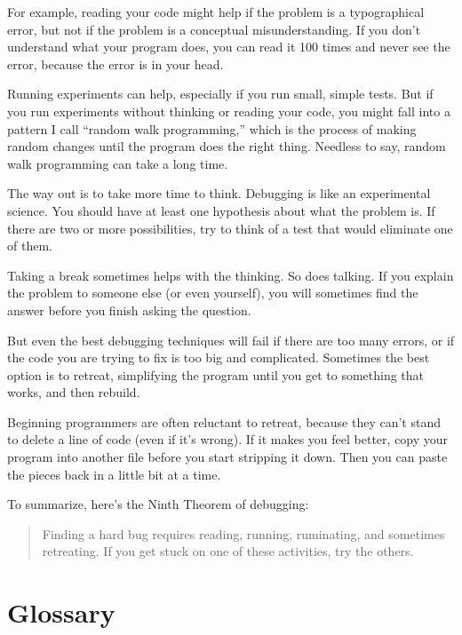 \documentclass{book}
\begin{document}
For example, reading your code might help if the problem is a
typographical error, but not if the problem is a conceptual
misunderstanding. If you don't understand what your program does, you
can read it 100 times and never see the error, because the error is in
your head.

Running experiments can help, especially if you run small, simple
tests. But if you run experiments without thinking or reading your
code, you might fall into a pattern I call ``random walk programming,''
which is the process of making random changes until the program
does the right thing. Needless to say, random walk programming
can take a long time.

The way out is to take more time to think. Debugging is like an
experimental science. You should have at least one hypothesis about
what the problem is. If there are two or more possibilities, try to
think of a test that would eliminate one of them.

Taking a break sometimes helps with the thinking. So does talking.
If you explain the problem to someone else (or even yourself), you
will sometimes find the answer before you finish asking the question.

But even the best debugging techniques will fail if there are too many
errors, or if the code you are trying to fix is too big and
complicated. Sometimes the best option is to retreat, simplifying the
program until you get to something that works, and then rebuild.

Beginning programmers are often reluctant to retreat, because
they can't stand to delete a line of code (even if it's wrong).
If it makes you feel better, copy your program into another file
before you start stripping it down. Then you can paste the pieces
back in a little bit at a time.

To summarize, here's the Ninth Theorem of debugging:

\begin{quote}
Finding a hard bug requires reading, running, ruminating, and
sometimes retreating. If you get stuck on one of these activities,
try the others.
\end{quote}



\section{Glossary}
\end{document}
